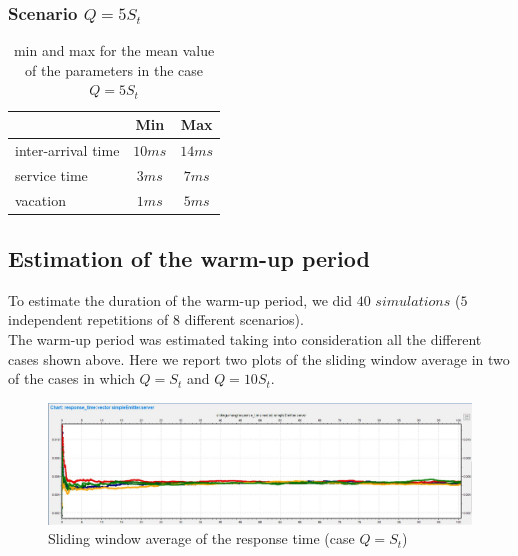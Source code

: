 \documentclass{article}
\begin{document}
        \subsubsection{Scenario $Q = 5S_t$}
             \begin{table}[htbp!]
                \centering 
                \begin{tabular}{|l|c|c|}
                    \hline
                    \ & Min & Max \\
                    \hline
                    inter-arrival time & $10ms$ & $14ms$ \\
                    \hline
                    service time & $3ms$ & $7ms$ \\
                    \hline
                    vacation & $1ms$ & $5ms$ \\
                    \hline
                \end{tabular}
                \caption{min and max for the mean value of the parameters in the case $Q = 5S_t$} 
            \end{table}
    
    \newpage
    
    \subsection{Estimation of the warm-up period}
    
        To estimate the duration of the warm-up period, we did $40$ $simulations$ ($5$ independent repetitions of $8$ different scenarios).\\
        
        The warm-up period was estimated taking into consideration all the different cases shown above. 
        Here we report two plots of the sliding window average in two of the cases in which $Q = S_t$ and $Q = 10S_t$.
        
        \begin{figure}[ht!]
            \centering
            \includegraphics[scale=0.3]{./images/sliding_window_averages/case5ms.JPG}
            \caption{Sliding window average of the response time (case $Q = S_t$)}
            \label{fig:sliding_avg_case5ms}
        \end{figure}
        
\end{document}
